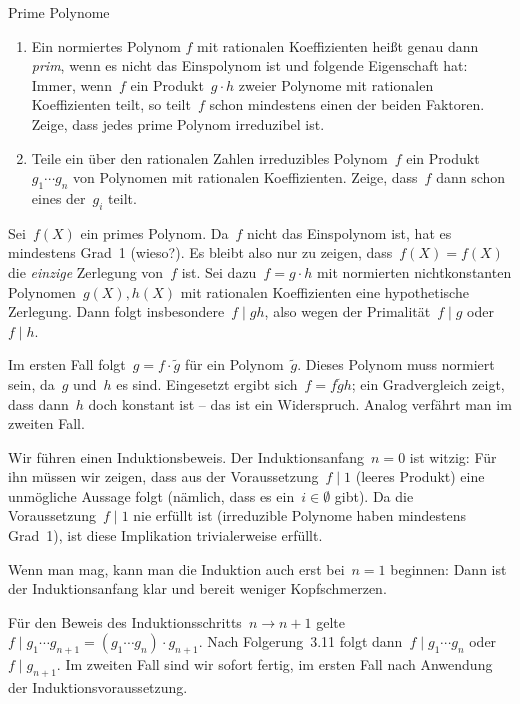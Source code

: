 \documentclass{algblatt}
\begin{document}
\begin{aufgabe}{Prime Polynome}
\begin{enumerate}
\item Ein normiertes Polynom $f$ mit rationalen Koeffizienten heißt
genau dann \emph{prim}, wenn es nicht das Einspolynom ist und folgende
Eigenschaft hat: Immer, wenn~$f$ ein
Produkt~$g \cdot h$ zweier Polynome mit
rationalen Koeffizienten teilt, so teilt~$f$ schon mindestens einen der
beiden Faktoren. Zeige, dass jedes prime Polynom irreduzibel ist.
\item Teile ein über den rationalen Zahlen irreduzibles Polynom~$f$ ein
Produkt~$g_1 \cdots g_n$ von Polynomen mit rationalen Koeffizienten.
Zeige, dass~$f$ dann schon eines der~$g_i$ teilt.
\end{enumerate}

\begin{loesungE}
\item Sei~$f(X)$ ein primes Polynom. Da~$f$ nicht das Einspolynom ist, hat es
mindestens Grad~1 (wieso?). Es bleibt also nur zu zeigen, dass~$f(X) = f(X)$
die \emph{einzige} Zerlegung von~$f$ ist. Sei dazu~$f = g \cdot h$ mit
normierten nichtkonstanten Polynomen~$g(X), h(X)$ mit rationalen Koeffizienten
eine hypothetische Zerlegung.
Dann folgt insbesondere~$f \mid gh$, also wegen der Primalität~$f \mid g$ oder~$f
\mid h$.

Im ersten Fall folgt~$g = f \cdot \widetilde g$ für ein
Polynom~$\widetilde g$. Dieses Polynom muss normiert sein, da~$g$ und~$h$ es
sind. Eingesetzt ergibt sich~$f = f \widetilde g h$; ein Gradvergleich zeigt,
dass dann~$h$ doch konstant ist -- das ist ein Widerspruch. Analog verfährt man
im zweiten Fall.

\item Wir führen einen Induktionsbeweis. Der Induktionsanfang~$n = 0$ ist
witzig: Für ihn müssen wir zeigen, dass aus der Voraussetzung~$f \mid 1$
(leeres Produkt) eine unmögliche Aussage folgt (nämlich, dass es ein~$i \in
\emptyset$ gibt). Da die Voraussetzung~$f \mid 1$ nie erfüllt ist (irreduzible
Polynome haben mindestens Grad~1), ist diese Implikation trivialerweise
erfüllt.

Wenn man mag, kann man die Induktion auch erst bei~$n = 1$ beginnen: Dann ist
der Induktionsanfang klar und bereit weniger Kopfschmerzen.

Für den Beweis des Induktionsschritts~$n \to n + 1$ gelte~$f \mid g_1 \cdots
g_{n+1} = (g_1 \cdots g_n) \cdot g_{n+1}$. Nach Folgerung~3.11 folgt dann~$f
\mid g_1 \cdots g_n$ oder~$f \mid g_{n+1}$. Im zweiten Fall sind wir sofort
fertig, im ersten Fall nach Anwendung der Induktionsvoraussetzung.
\end{loesungE}
\end{aufgabe}
\end{document}
